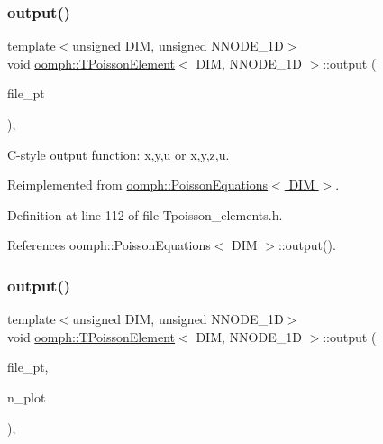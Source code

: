 \subsubsection{\texorpdfstring{output()}{output()}\hspace{0.1cm}{\footnotesize\ttfamily [3/4]}}
{\footnotesize\ttfamily template$<$unsigned D\+IM, unsigned N\+N\+O\+D\+E\+\_\+1D$>$ \\
void \hyperlink{classoomph_1_1TPoissonElement}{oomph\+::\+T\+Poisson\+Element}$<$ D\+IM, N\+N\+O\+D\+E\+\_\+1D $>$\+::output (\begin{DoxyParamCaption}\item[{F\+I\+LE $\ast$}]{file\+\_\+pt }\end{DoxyParamCaption})\hspace{0.3cm}{\ttfamily [inline]}, {\ttfamily [virtual]}}



C-\/style output function\+: x,y,u or x,y,z,u. 



Reimplemented from \hyperlink{classoomph_1_1PoissonEquations_afeaa8b136b9cc9649635b41bde1b5cda}{oomph\+::\+Poisson\+Equations$<$ D\+I\+M $>$}.



Definition at line 112 of file Tpoisson\+\_\+elements.\+h.



References oomph\+::\+Poisson\+Equations$<$ D\+I\+M $>$\+::output().

\mbox{\label{classoomph_1_1TPoissonElement_a9abacba6348984ea82fa08bdf8ff2f9e}} 
\subsubsection{\texorpdfstring{output()}{output()}\hspace{0.1cm}{\footnotesize\ttfamily [4/4]}}
{\footnotesize\ttfamily template$<$unsigned D\+IM, unsigned N\+N\+O\+D\+E\+\_\+1D$>$ \\
void \hyperlink{classoomph_1_1TPoissonElement}{oomph\+::\+T\+Poisson\+Element}$<$ D\+IM, N\+N\+O\+D\+E\+\_\+1D $>$\+::output (\begin{DoxyParamCaption}\item[{F\+I\+LE $\ast$}]{file\+\_\+pt,  }\item[{const unsigned \&}]{n\+\_\+plot }\end{DoxyParamCaption})\hspace{0.3cm}{\ttfamily [inline]}, {\ttfamily [virtual]}}



